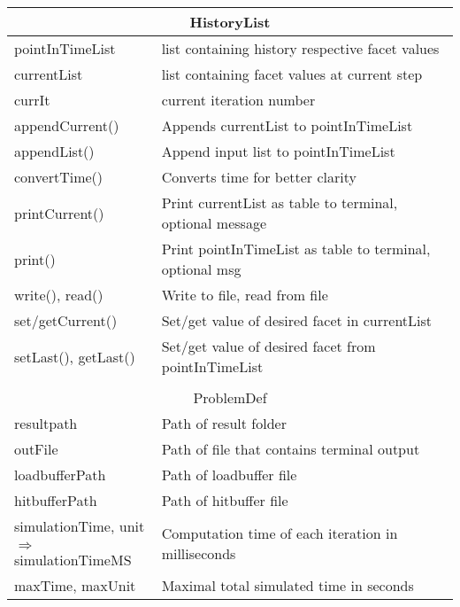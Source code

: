 \begin{center}
\begin{tabular}{|l|l|}
\hline
\multicolumn{2}{|c|}{\rule{0pt}{3ex}HistoryList}\\
\hline
\rule{0pt}{3ex} pointInTimeList& list containing history respective facet values\\
\rule{0pt}{3ex} currentList& list containing facet values at current step\\
\rule{0pt}{3ex} currIt& current iteration number\\
\hline
\rule{0pt}{3ex} appendCurrent()& Appends currentList to pointInTimeList\\
\rule{0pt}{3ex} appendList()& Append input list to pointInTimeList\\
\rule{0pt}{3ex} convertTime()& Converts time for better clarity\\
\rule{0pt}{3ex} printCurrent()& Print currentList as table to terminal, optional message\\
\rule{0pt}{3ex} print()& Print pointInTimeList as table to terminal, optional msg\\
\rule{0pt}{3ex} write(), read()& Write to file, read from file\\
\rule{0pt}{3ex} set/getCurrent()& Set/get value of desired facet in currentList\\
\rule{0pt}{3ex} setLast(), getLast()& Set/get value of desired facet from pointInTimeList\\
\hline
\multicolumn{2}{l}{}\\
\hline
\multicolumn{2}{|c|}{\rule{0pt}{3ex}ProblemDef}\\
\hline
\rule{0pt}{3ex} resultpath& Path of result folder\\
\rule{0pt}{3ex} outFile& Path of file that contains terminal output\\
\rule{0pt}{3ex} loadbufferPath& Path of loadbuffer file\\
\rule{0pt}{3ex} hitbufferPath& Path of hitbuffer file\\
\rule{0pt}{3ex} simulationTime, unit& \multirow{2}{*}{Computation time of each iteration in milliseconds}\\
\enskip$\Rightarrow$simulationTimeMS&\\
\rule{0pt}{3ex} maxTime, maxUnit& \multirow{2}{*}{Maximal total simulated time in seconds}\\

\end{tabular}
\end{center}
